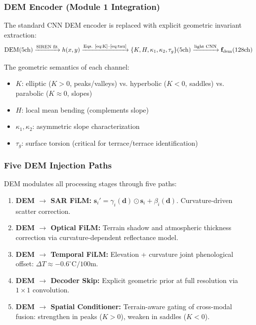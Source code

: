 \subsubsection{DEM Encoder (Module 1 Integration)}

The standard CNN DEM encoder is replaced with explicit geometric invariant
extraction:
\begin{equation}
    \text{DEM}(5\text{ch}) \xrightarrow{\text{SIREN fit}} h(x,y)
    \xrightarrow{\text{Eqs. \eqref{eq:K}--\eqref{eq:tau}}}
    \{K, H, \kappa_1, \kappa_2, \tau_g\}(5\text{ch})
    \xrightarrow{\text{light CNN}} \mathbf{f}_{\text{dem}}(128\text{ch})
\end{equation}

The geometric semantics of each channel:
\begin{itemize}
    \item $K$: elliptic ($K>0$, peaks/valleys) vs. hyperbolic ($K<0$, saddles)
    vs. parabolic ($K\approx0$, slopes)
    \item $H$: local mean bending (complements slope)
    \item $\kappa_1, \kappa_2$: asymmetric slope characterization
    \item $\tau_g$: surface torsion (critical for terrace/terrace identification)
\end{itemize}

\subsubsection{Five DEM Injection Paths}

DEM modulates all processing stages through five paths:

\begin{enumerate}
    \item \textbf{DEM $\to$ SAR FiLM:} $\mathbf{s}_i' = \gamma_i(\mathbf{d}) \odot \mathbf{s}_i + \beta_i(\mathbf{d})$.
    Curvature-driven scatter correction.

    \item \textbf{DEM $\to$ Optical FiLM:} Terrain shadow and atmospheric
    thickness correction via curvature-dependent reflectance model.

    \item \textbf{DEM $\to$ Temporal FiLM:} Elevation + curvature joint
    phenological offset: $\Delta T \approx -0.6^\circ\text{C}/100\text{m}$.

    \item \textbf{DEM $\to$ Decoder Skip:} Explicit geometric prior at full
    resolution via $1\times1$ convolution.

    \item \textbf{DEM $\to$ Spatial Conditioner:} Terrain-aware gating of
    cross-modal fusion: strengthen in peaks ($K>0$), weaken in saddles ($K<0$).
\end{enumerate}

